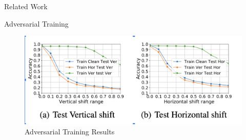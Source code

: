 \begin{frame}{Related Work}

    \begin{block}{Adversarial Training}
        
    \end{block}

    \begin{figure}
        \centering
        \includegraphics[width=\textwidth, height=.6\textheight]{images/adv.png}
        \caption{Adversarial Training Results}
        \label{fig:adversetraining}
    \end{figure}


\end{frame}